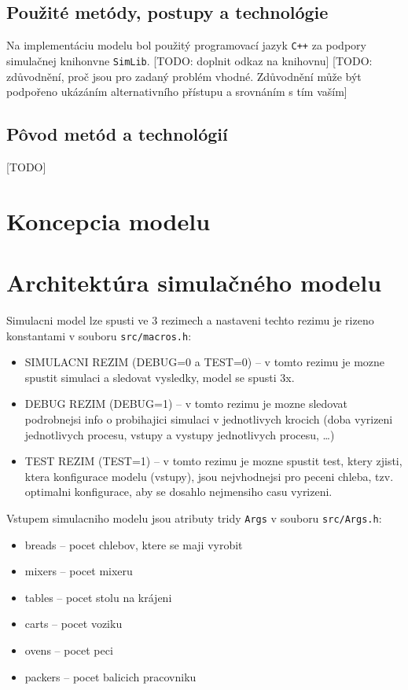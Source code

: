\documentclass[a4paper, 10pt]{article}
\begin{document}
    \subsection{Použité metódy, postupy a technológie}
    Na implementáciu modelu bol použitý programovací jazyk \texttt{C++} za podpory simulačnej knihonvne \texttt{SimLib}.
    [TODO: doplnit odkaz na knihovnu] [TODO: zdůvodnění, proč jsou pro zadaný problém vhodné. Zdůvodnění může být podpořeno ukázáním alternativního přístupu a srovnáním s tím vaším]
    \subsection{Pôvod metód a technológií}
    [TODO]

    \section {Koncepcia modelu}


    \section{Architektúra simulačného modelu}
    Simulacni model\cite[slide 44]{IMS_slides} lze spusti ve 3 rezimech a nastaveni techto rezimu je rizeno konstantami v souboru
    \texttt{src/macros.h}:
    \begin{itemize}
        \item SIMULACNI REZIM (DEBUG=0 a TEST=0) -- v tomto rezimu je mozne spustit simulaci a sledovat vysledky, model se spusti 3x.
        \item DEBUG REZIM (DEBUG=1) -- v tomto rezimu je mozne sledovat podrobnejsi info o probihajici simulaci
        v jednotlivych krocich (doba vyrizeni jednotlivych procesu, vstupy a vystupy jednotlivych procesu, \ldots)
        \item TEST REZIM (TEST=1) -- v tomto rezimu je mozne spustit test, ktery zjisti, ktera konfigurace modelu (vstupy),
        jsou nejvhodnejsi pro peceni chleba, tzv. optimalni konfigurace, aby se dosahlo nejmensiho casu vyrizeni.
    \end{itemize}

    Vstupem simulacniho modelu jsou atributy tridy \texttt{Args} v souboru \texttt{src/Args.h}:
    \begin{itemize}
        \item breads -- pocet chlebov, ktere se maji vyrobit
        \item mixers -- pocet mixeru
        \item tables -- pocet stolu na krájeni
        \item carts -- pocet voziku
        \item ovens -- pocet peci
        \item packers -- pocet balicich pracovniku
    \end{itemize}
\end{document}
